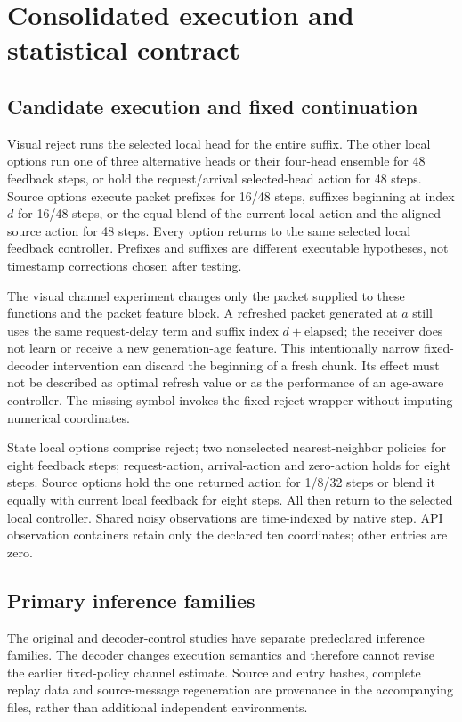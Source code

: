 \section{Consolidated execution and statistical contract}
\subsection{Candidate execution and fixed continuation}

Visual reject runs the selected local head for the entire suffix. The other local options run one of three alternative heads or their four-head ensemble for 48 feedback steps, or hold the request/arrival selected-head action for 48 steps. Source options execute packet prefixes for 16/48 steps, suffixes beginning at index $d$ for 16/48 steps, or the equal blend of the current local action and the aligned source action for 48 steps. Every option returns to the same selected local feedback controller. Prefixes and suffixes are different executable hypotheses, not timestamp corrections chosen after testing.

The visual channel experiment changes only the packet supplied to these functions and the packet feature block. A refreshed packet generated at $a$ still uses the same request-delay term and suffix index $d+\text{elapsed}$; the receiver does not learn or receive a new generation-age feature. This intentionally narrow fixed-decoder intervention can discard the beginning of a fresh chunk. Its effect must not be described as optimal refresh value or as the performance of an age-aware controller. The missing symbol invokes the fixed reject wrapper without imputing numerical coordinates.

State local options comprise reject; two nonselected nearest-neighbor policies for eight feedback steps; request-action, arrival-action and zero-action holds for eight steps. Source options hold the one returned action for 1/8/32 steps or blend it equally with current local feedback for eight steps. All then return to the selected local controller. Shared noisy observations are time-indexed by native step. API observation containers retain only the declared ten coordinates; other entries are zero.


\subsection{Primary inference families}\label{s-sec:inferencematrix}

The original and decoder-control studies have separate predeclared inference families. The decoder changes execution semantics and therefore cannot revise the earlier fixed-policy channel estimate. Source and entry hashes, complete replay data and source-message regeneration are provenance in the accompanying files, rather than additional independent environments.

